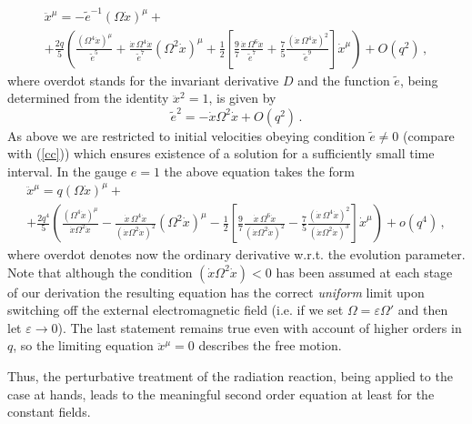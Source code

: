 \documentclass[a4paper,12pt]{article}
\begin{document}
\begin{equation}\label{reduced}
\begin{array}{c}
\displaystyle{\ddot{x}^\mu=-\tilde{e}^{-1}(\Omega \dot{x})^\mu+}\\[5mm]
\displaystyle{+\frac{2q}5
\left(\frac{(\Omega^4\dot{x})^\mu}{\tilde{e}^5}+\frac{\dot{x}\,\Omega^4\dot{x}}{
\tilde{e}^7}(\Omega^2\dot{x})^\mu
+\frac12\left[\frac97\frac{\dot{x}\,\Omega^6\dot{x}}{\tilde{e}^7}+
\frac75\frac{(\dot{x}\,\Omega^4\dot{x})^2}{\tilde{e}^9}\right]\dot{x}^\mu
\right)+O(q^2)}\,,
\end{array}
\end{equation}
where overdot stands for the invariant derivative $D$ and the
function  $\tilde{e}$, being determined from the identity
$\ddot{x}^2=1$, is given by
\begin{equation}\label{}
  \tilde{e}^2=-\dot{x}\Omega^2\dot{x}+O(q^2)\,.
\end{equation}
As above we are restricted to initial velocities obeying condition
$\tilde{e}\neq  0$ (compare with (\ref{cc})) which ensures
existence of a solution for a sufficiently small time interval. In
the gauge $e=1$ the above equation takes the form
\begin{equation}\label{reduced1}
\begin{array}{c}
\displaystyle{\ddot{x}^\mu=q(\Omega \dot{x})^\mu+}\\[5mm]
\displaystyle{+\frac{2q^4}5
\left(\frac{(\Omega^4\dot{x})^\mu}{\dot x\Omega^2\dot x
}-\frac{\dot{x}\,\Omega^4\dot{x}}{ (\dot x\Omega^2\dot x
)^2}(\Omega^2\dot{x})^\mu
-\frac12\left[\frac97\frac{\dot{x}\,\Omega^6\dot{x}}{(\dot
x\Omega^2\dot x )^2}-
\frac75\frac{(\dot{x}\,\Omega^4\dot{x})^2}{(\dot x\Omega^2\dot x
)^3}\right]\dot{x}^\mu \right)+o(q^4)}\,,
\end{array}
\end{equation}
where overdot denotes now the ordinary derivative w.r.t. the
evolution parameter. Note that although the condition
 $(\dot x\Omega^2\dot x)<0$ has been assumed at each stage of our
derivation the resulting equation has the correct
\textit{uniform} limit upon switching off the external
electromagnetic field (i.e. if we set $\Omega=\varepsilon\Omega'$
and then let $\varepsilon\rightarrow 0$). The last statement
remains true even with account of higher orders in $q$, so the
limiting equation $\ddot x^\mu =0$ describes the free motion.

Thus, the perturbative  treatment of the radiation reaction,
being applied to the case at hands, leads to the meaningful second
order equation at least for the constant fields.
\end{document}
